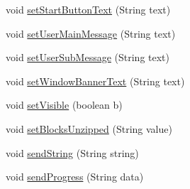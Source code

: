 \begin{DoxyCompactItemize}
void \hyperlink{interface_c_a_s_u_a_l_1_1i_c_a_s_u_a_l_u_i_ac167fc3b103f2df9be9552328046bb33}{set\-Start\-Button\-Text} (String text)
\item 
void \hyperlink{interface_c_a_s_u_a_l_1_1i_c_a_s_u_a_l_u_i_a3866696d97f3ada27405a4187a677e59}{set\-User\-Main\-Message} (String text)
\item 
void \hyperlink{interface_c_a_s_u_a_l_1_1i_c_a_s_u_a_l_u_i_aa0d6805bc418dbad03f639519fecc271}{set\-User\-Sub\-Message} (String text)
\item 
void \hyperlink{interface_c_a_s_u_a_l_1_1i_c_a_s_u_a_l_u_i_ab1c7e23a5e59fbceae8bfd5956aa08f7}{set\-Window\-Banner\-Text} (String text)
\item 
void \hyperlink{interface_c_a_s_u_a_l_1_1i_c_a_s_u_a_l_u_i_aec2f44b54ad0c4c6b93f10b3503482ec}{set\-Visible} (boolean b)
\item 
void \hyperlink{interface_c_a_s_u_a_l_1_1i_c_a_s_u_a_l_u_i_ad61cabc7f900c6f03354843a8b5b799a}{set\-Blocks\-Unzipped} (String value)
\item 
void \hyperlink{interface_c_a_s_u_a_l_1_1i_c_a_s_u_a_l_u_i_a5a7114f2fa2b9ce291bcccd80458ce7e}{send\-String} (String string)
\item 
void \hyperlink{interface_c_a_s_u_a_l_1_1i_c_a_s_u_a_l_u_i_a74df2efef353d4c2c30c1c6452445366}{send\-Progress} (String data)
\end{DoxyCompactItemize}
